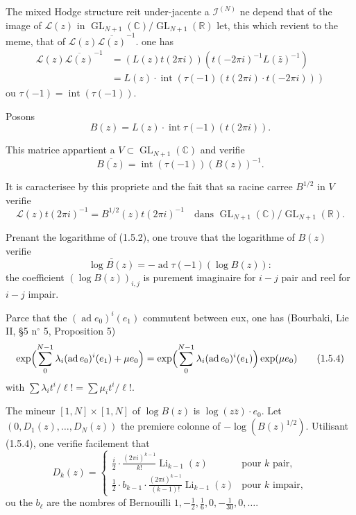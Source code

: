\documentclass[12pt,a4paper]{article}
\theoremstyle{plain}
\theoremstyle{definition}
\theoremstyle{remark}
\DeclareMathOperator{\ad}{ad}
\DeclareMathOperator{\intt}{int}
\newcommand{\R}{\mathbb{R}}
\newcommand{\C}{\mathbb{C}}
\begin{document}
{The mixed Hodge structure r{e}it under-jacente {a} $\mathcal{I}^{(N)}$ ne d{e}pend that of the image of $\mathcal{L}(z)$ in $\operatorname{GL}_{N+1}(\C)/\operatorname{GL}_{N+1}(\R)$ let, this which revient to the m{e}me, that of $\mathcal{L}(z)\overline{\mathcal{L}(z)}^{-1}$. one has
\begin{align*}
\mathcal{L}(z)\overline{\mathcal{L}(z)}^{-1} &= (L(z)t(2\pi i))(t(-2\pi i)^{-1}L(\bar{z})^{-1})\\
&= L(z)\cdot\intt(\tau(-1)(t(2\pi i)\cdot t(-2\pi i)))
\end{align*}
o{u} $\tau(-1)=\intt(\tau(-1))$.

Posons
\begin{equation}\label{eq:1.5.1}
B(z) = L(z)\cdot\intt\tau(-1)(t(2\pi i)).
\tag{1.5.1}
\end{equation}

This matrice appartient {a} $V\subset\operatorname{GL}_{N+1}(\C)$ and v{e}rifie
\begin{equation}\label{eq:1.5.2}
\overline{B(z)} = \intt(\tau(-1))(B(z))^{-1}.
\tag{1.5.2}
\end{equation}

It is caract{e}ris{e}e by this propri{e}t{e} and the fait that sa racine carr{e}e $B^{1/2}$ in $V$ v{e}rifie
\begin{equation}\label{eq:1.5.3}
\mathcal{L}(z)t(2\pi i)^{-1} = B^{1/2}(z)t(2\pi i)^{-1} \quad \text{dans }\operatorname{GL}_{N+1}(\C)/\operatorname{GL}_{N+1}(\R).
\tag{1.5.3}
\end{equation}

Prenant the logarithme of (1.5.2), one trouve that the logarithme of $B(z)$ v{e}rifie
\begin{equation*}
\overline{\log B(z)} = -\ad\tau(-1)(\log B(z)):
\end{equation*}
the coefficient $(\log B(z))_{i,j}$ is purement imaginaire for $i-j$ pair and r{e}el for $i-j$ impair.

Parce that the $(\ad e_0)^i(e_1)$ commutent between eux, one has (Bourbaki, Lie II, \S 5 n$^\circ$ 5, Proposition 5)
\begin{equation}\label{eq:1.5.4}
\exp\Bigl(\sum_0^{N-1}\lambda_i(\ad e_0)^i(e_1)+\mu e_0\Bigr) = \exp\Bigl(\sum_0^{N-1}\lambda_i(\ad e_0)^i(e_1)\Bigr)\exp(\mu e_0)
\tag{1.5.4}
\end{equation}
with $\sum\lambda_it^i/\ell!=\sum\mu_i t^i/\ell!$.

The mineur $[1,N]\times[1,N]$ of $\log B(z)$ is $\log(z\bar{z})\cdot e_0$. Let $(0,D_1(z),\ldots,D_N(z))$ the premi{e}re colonne of $-\log(B(z)^{1/2})$. Utilisant (1.5.4), one v{e}rifie facilement that
\begin{equation*}
D_k(z) = \begin{cases}
\displaystyle\frac{i}{2}\cdot\frac{(2\pi i)^{k-1}}{k!}\operatorname{Li}_{k-1}(z) & \text{pour }k\text{ pair},\\[1.5ex]
\displaystyle\frac{1}{2}\cdot b_{k-1}\cdot\frac{(2\pi i)^{k-1}}{(k-1)!}\operatorname{Li}_{k-1}(z) & \text{pour }k\text{ impair},
\end{cases}
\end{equation*}
o{u} the $b_\ell$ are the nombres of Bernouilli $1,-\tfrac{1}{2},\tfrac{1}{6},0,-\tfrac{1}{30},0,\ldots$.

}
\end{document}
